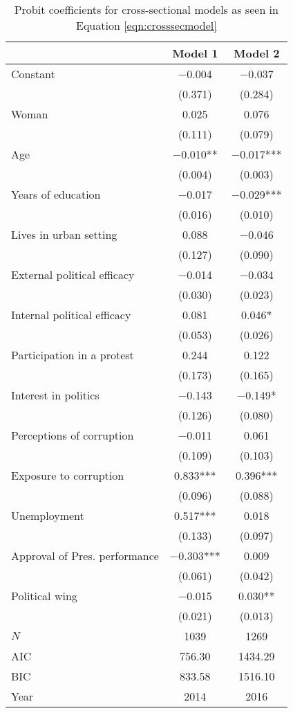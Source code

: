 \documentclass[12pt,a4]{article}
\begin{document}
\begin{table}[htbp]
\begin{center}
\caption{Probit coefficients for cross-sectional models as seen in Equation \ref{eqn:crosssecmodel}}
\label{tab:complexmodcprob}

\begin{tabular}[t]{lcc}
\toprule
  & Model 1 & Model 2\\
\midrule
Constant & \num{-0.004} & \num{-0.037}\\
 & (\num{0.371}) & (\num{0.284})\\
Woman & \num{0.025} & \num{0.076}\\
 & (\num{0.111}) & (\num{0.079})\\
Age & \num{-0.010}** & \num{-0.017}***\\
 & (\num{0.004}) & (\num{0.003})\\
Years of education & \num{-0.017} & \num{-0.029}***\\
 & (\num{0.016}) & (\num{0.010})\\
Lives in urban setting & \num{0.088} & \num{-0.046}\\
 & (\num{0.127}) & (\num{0.090})\\
External political efficacy & \num{-0.014} & \num{-0.034}\\
 & (\num{0.030}) & (\num{0.023})\\
Internal political efficacy & \num{0.081} & \num{0.046}*\\
 & (\num{0.053}) & (\num{0.026})\\
Participation in a protest & \num{0.244} & \num{0.122}\\
 & (\num{0.173}) & (\num{0.165})\\
Interest in politics & \num{-0.143} & \num{-0.149}*\\
 & (\num{0.126}) & (\num{0.080})\\
Perceptions of corruption & \num{-0.011} & \num{0.061}\\
 & (\num{0.109}) & (\num{0.103})\\
Exposure to corruption & \num{0.833}*** & \num{0.396}***\\
 & (\num{0.096}) & (\num{0.088})\\
Unemployment & \num{0.517}*** & \num{0.018}\\
 & (\num{0.133}) & (\num{0.097})\\
Approval of Pres. performance & \num{-0.303}*** & \num{0.009}\\
 & (\num{0.061}) & (\num{0.042})\\
Political wing & \num{-0.015} & \num{0.030}**\\
 & (\num{0.021}) & (\num{0.013})\\
\midrule
$N$ & \num{1039} & \num{1269}\\
AIC & \num{756.30} & \num{1434.29}\\
BIC & \num{833.58} & \num{1516.10}\\
Year & 2014 & 2016\\
\bottomrule
\end{tabular}



\end{center}
\end{table}
\end{document}
